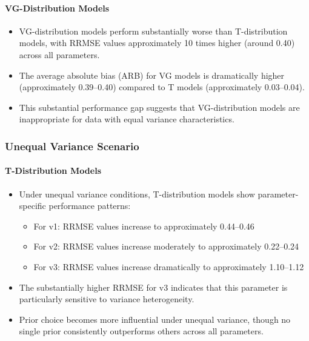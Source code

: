 \documentclass[10.5pt]{article} %
\begin{document}
\paragraph{VG-Distribution Models}
\begin{itemize}
    \item VG-distribution models perform substantially worse than T-distribution models, with RRMSE values approximately 10 times higher (around 0.40) across all parameters.
    \item The average absolute bias (ARB) for VG models is dramatically higher (approximately 0.39–0.40) compared to T models (approximately 0.03–0.04).
    \item This substantial performance gap suggests that VG-distribution models are inappropriate for data with equal variance characteristics.
\end{itemize}

\subsubsection{Unequal Variance Scenario}

\paragraph{T-Distribution Models}
\begin{itemize}
    \item Under unequal variance conditions, T-distribution models show parameter-specific performance patterns:
    \begin{itemize}
        \item For v1: RRMSE values increase to approximately 0.44–0.46
        \item For v2: RRMSE values increase moderately to approximately 0.22–0.24
        \item For v3: RRMSE values increase dramatically to approximately 1.10–1.12
    \end{itemize}
    \item The substantially higher RRMSE for v3 indicates that this parameter is particularly sensitive to variance heterogeneity.
    \item Prior choice becomes more influential under unequal variance, though no single prior consistently outperforms others across all parameters.
\end{itemize}
\end{document}

